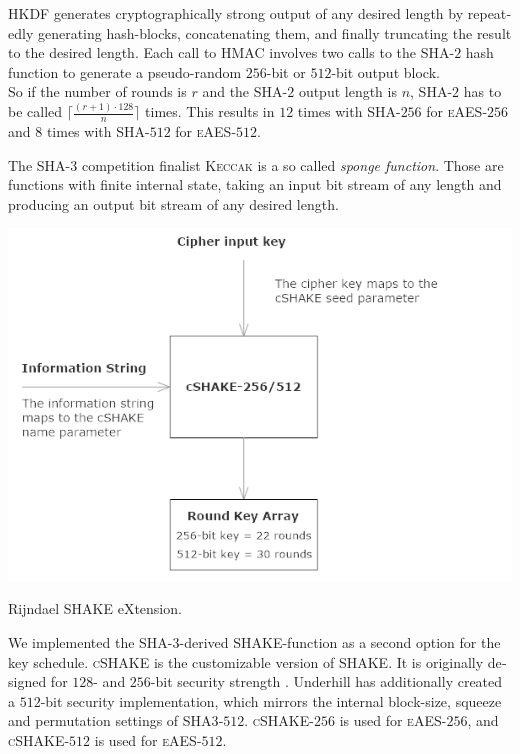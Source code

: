 \documentclass[a4paper,11pt]{article}
\begin{document}
\begin{otherlanguage}{english}
\begin{multicols}{2}
\noindent
\textsc{HKDF} generates cryptographically strong output of any desired length by repeatedly generating hash-blocks, concatenating them, and finally truncating the result to the desired length. 
Each call to \textsc{HMAC} involves two calls to the \textsc{SHA}-$2$ hash function to generate a pseudo-random $256$-bit or $512$-bit output block. \\

\noindent
So if the number of rounds is $r$ and the \textsc{SHA}-$2$ output length is $n$, \textsc{SHA}-$2$ has to be called $\lceil\frac{(r+1)\cdot128}{n}\rceil$ times. This results in $12$ times with \textsc{SHA}-$256$ for \textsc{eAES}-$256$ and $8$ times with \textsc{SHA}-$512$ for \textsc{eAES}-$512$.

\noindent
The \textsc{SHA}-$3$ competition finalist \textsc{Keccak} is a so called \textit{sponge function}. Those are functions with finite internal state, taking an input bit stream of any length and producing an output bit stream of any desired length. 

\begin{figurehere}
  \centering
  \includegraphics[width=\columnwidth]{RSX-schematic.png}
  \caption{Rijndael SHAKE eXtension.\label{abb_4}}
\end{figurehere}

\vspace{0.3cm}
\noindent
We implemented the \textsc{SHA}-$3$-derived \textsc{SHAKE}-function as a second option for the key schedule. \textsc{cSHAKE} is the customizable version of \textsc{SHAKE}. It is originally designed for $128$- and $256$-bit security strength \cite{SHK}. Underhill has additionally created a $512$-bit security implementation, which mirrors the internal block-size, squeeze and permutation settings of \textsc{SHA3}-$512$. \textsc{cSHAKE}-$256$ is used for \textsc{eAES}-$256$, and \textsc{cSHAKE}-$512$ is used for \textsc{eAES}-$512$.\\


\end{multicols}
\end{otherlanguage}
\end{document}

